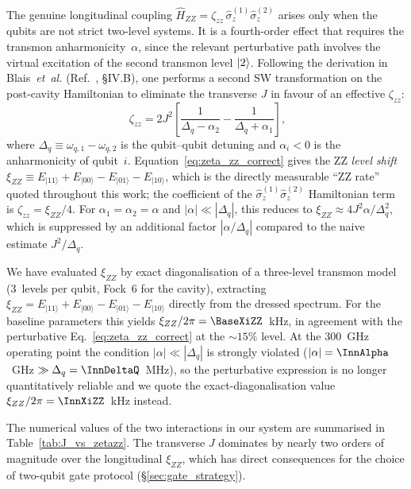 The genuine longitudinal coupling
$\hat{H}_{ZZ} = \zeta_{zz}\,\hat{\sigma}_z^{(1)}\hat{\sigma}_z^{(2)}$
arises only when the qubits are not strict two-level systems. It is a
fourth-order effect that requires the transmon anharmonicity~$\alpha$, since
the relevant perturbative path involves the virtual excitation of the second
transmon level $\ket{2}$. Following the derivation in Blais~\textit{et~al.}
(Ref.~\cite{blais2021circuit}, \S{IV.B}), one performs a second SW transformation
on the post-cavity Hamiltonian to eliminate the transverse $J$ in favour of an
effective $\zeta_{zz}$:
\begin{equation}
\boxed{\;
\zeta_{zz} = 2J^{2}\!\left[
\frac{1}{\Delta_q - \alpha_2} - \frac{1}{\Delta_q + \alpha_1}
\right] ,
}
\label{eq:zeta_zz_correct}
\end{equation}
where $\Delta_q \equiv \omega_{q,1} - \omega_{q,2}$ is the qubit--qubit detuning
and $\alpha_i < 0$ is the anharmonicity of qubit~$i$. Equation~\eqref{eq:zeta_zz_correct}
gives the ZZ \emph{level shift}
$\xi_{ZZ}\equiv E_{|11\rangle}+E_{|00\rangle}-E_{|01\rangle}-E_{|10\rangle}$,
which is the directly measurable ``ZZ rate'' quoted throughout this work; the
coefficient of the $\hat\sigma_z^{(1)}\hat\sigma_z^{(2)}$ Hamiltonian term is
$\zeta_{zz}=\xi_{ZZ}/4$. For
$\alpha_1=\alpha_2=\alpha$ and $|\alpha|\ll|\Delta_q|$, this reduces to
$\xi_{ZZ}\approx 4J^2 \alpha/\Delta_q^2$, which is suppressed by an additional
factor $|\alpha/\Delta_q|$ compared to the naive estimate $J^2/\Delta_q$.

We have evaluated $\xi_{ZZ}$ by exact diagonalisation of a three-level transmon
model (3~levels per qubit, Fock~6 for the cavity), extracting
$\xi_{ZZ}=E_{|11\rangle}+E_{|00\rangle}-E_{|01\rangle}-E_{|10\rangle}$ directly
from the dressed spectrum. For the baseline parameters this yields
$\xi_{ZZ}/2\pi = \BaseXiZZ$~kHz, in agreement with the perturbative
Eq.~\eqref{eq:zeta_zz_correct} at the $\sim15\%$ level. At the 300~GHz operating
point the condition $|\alpha|\ll|\Delta_q|$ is strongly violated
($|\alpha|=\InnAlpha$~GHz $\gg \Delta_q=\InnDeltaQ$~MHz), so the perturbative
expression is no longer quantitatively reliable and we quote the
exact-diagonalisation value $\xi_{ZZ}/2\pi = \InnXiZZ$~kHz instead.

The numerical values of the two interactions in our system are summarised in
Table~\ref{tab:J_vs_zetazz}. The transverse $J$ dominates by nearly two orders
of magnitude over the longitudinal $\xi_{ZZ}$, which has direct consequences
for the choice of two-qubit gate protocol (\S\ref{sec:gate_strategy}).

